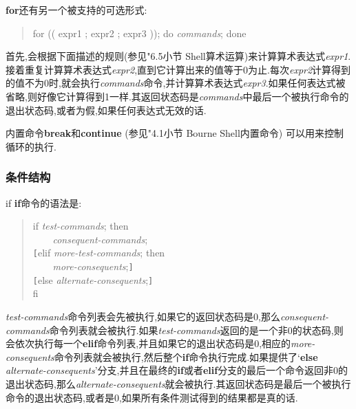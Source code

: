 \documentclass[draft,openany]{book}
\begin{document}
\begin{CJK}{UTF8}{gbsn}
\begin{basedescript}{\desclabelstyle{\nextlinelabel}\desclabelwidth{2.5em}}
        \textbf{for}还有另一个被支持的可选形式:
        \begin{quote}
            for (( expr1 ; expr2 ; expr3 )); do \emph{commands}; done
        \end{quote}
        首先,会根据下面描述的规则(参见"6.5小节 Shell算术运算)来计算算术表达式\emph{expr1}.接着重复计算算术表达式\emph{expr2},直到它计算出来的值等于0为止.每次\emph{expr2}计算得到的值不为0时,就会执行\emph{commands}命令,并计算算术表达式\emph{expr3}.如果任何表达式被省略,则好像它计算得到1一样.其返回状态码是\emph{commands}中最后一个被执行命令的退出状态码,或者为假,如果任何表达式无效的话.
    \end{basedescript}
    内置命令\textbf{break}和\textbf{continue} (参见"4.1小节 Bourne Shell内置命令) 可以用来控制循环的执行.
    \subsubsection{条件结构}
    \begin{basedescript}{\desclabelstyle{\nextlinelabel}\desclabelwidth{2.5em}}
    \item[if] \textbf{if}命令的语法是:
        \begin{quote}
            if \emph{test-commands}; then\\
            \verb+    +\emph{consequent-commands};\\
            \verb+[+elif \emph{more-test-commands}; then\\
            \verb+    +\emph{more-consequents};\verb+]+\\
            \verb+[+else \emph{alternate-consequents};\verb+]+\\
            fi
        \end{quote}
        \emph{test-commands}命令列表会先被执行,如果它的返回状态码是0,那么\emph{consequent-commands}命令列表就会被执行.如果\emph{test-commands}返回的是一个非0的状态码,则会依次执行每一个\textbf{elif}命令列表,并且如果它的退出状态码是0,相应的\emph{more-consequents}命令列表就会被执行,然后整个\textbf{if}命令执行完成.如果提供了`\textbf{else} \emph{alternate-consequents}'分支,并且在最终的\textbf{if}或者\textbf{elif}分支的最后一个命令返回非0的退出状态码,那么\emph{alternate-consequents}就会被执行.其返回状态码是最后一个被执行命令的退出状态码,或者是0,如果所有条件测试得到的结果都是真的话.

\end{basedescript}
\end{CJK}
\end{document}
